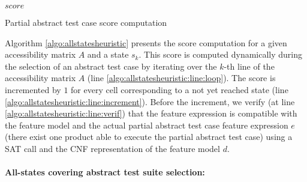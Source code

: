 \begin{algorithm}
 \Return $score$\;
 \caption{Partial abstract test case score computation}
 \label{algo:allstatesheuristic}
\end{algorithm}

Algorithm \ref{algo:allstatesheuristic} presents the score computation for a given accessibility matrix $A$ and a state $s_k$.
This score is computed dynamically during the selection of an abstract test case by iterating over the $k$-th line of the accessibility matrix $A$ (line \ref{algo:allstatesheuristic:line:loop}). The score is incremented by $1$ for every cell corresponding to a not yet reached state (line \ref{algo:allstatesheuristic:line:increment}). Before the increment, we verify (at line \ref{algo:allstatesheuristic:line:verif}) that the feature expression is compatible with the feature model and the actual partial abstract test case feature expression $e$ (\ie there exist one product able to execute the partial abstract test case) using a SAT call and the \gls{CNF} representation of the feature model $d$.

\paragraph{All-states covering abstract test suite selection:}

